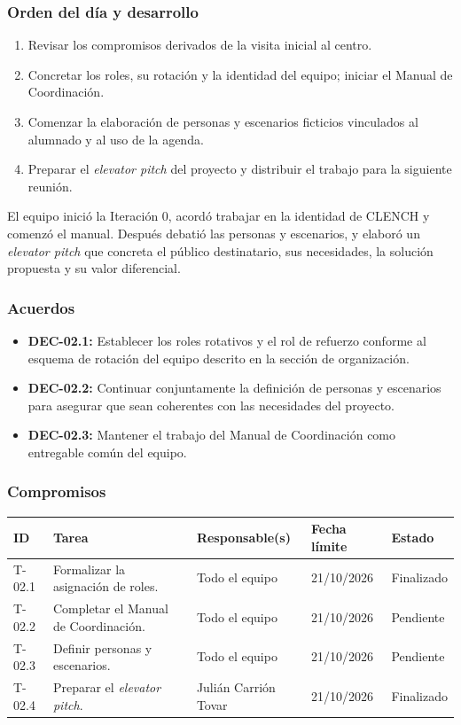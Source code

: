 \subsubsection{Orden del día y desarrollo}
\begin{enumerate}[leftmargin=*]
  \item Revisar los compromisos derivados de la visita inicial al centro.
  \item Concretar los roles, su rotación y la identidad del equipo; iniciar el Manual de Coordinación.
  \item Comenzar la elaboración de personas y escenarios ficticios vinculados al alumnado y al uso de la agenda.
  \item Preparar el \textit{elevator pitch} del proyecto y distribuir el trabajo para la siguiente reunión.
\end{enumerate}
El equipo inició la Iteración 0, acordó trabajar en la identidad de CLENCH y comenzó el manual. Después debatió las personas y escenarios, y elaboró un \textit{elevator pitch} que concreta el público destinatario, sus necesidades, la solución propuesta y su valor diferencial.

\subsubsection{Acuerdos}
\begin{itemize}[leftmargin=*]
  \item \textbf{DEC-02.1:} Establecer los roles rotativos y el rol de refuerzo conforme al esquema de rotación del equipo descrito en la sección de organización.
  \item \textbf{DEC-02.2:} Continuar conjuntamente la definición de personas y escenarios para asegurar que sean coherentes con las necesidades del proyecto.
  \item \textbf{DEC-02.3:} Mantener el trabajo del Manual de Coordinación como entregable común del equipo.
\end{itemize}

\subsubsection{Compromisos}
\begin{center}\footnotesize
\begin{tabularx}{\textwidth}{@{}p{}X p{}p{}p{}@{}}
\toprule
\rowcolor{tableHeader} ID & Tarea & Responsable(s) & Fecha límite & Estado \\
\midrule
T-02.1 & Formalizar la asignación de roles. & Todo el equipo & 21/10/2026 & Finalizado \\
T-02.2 & Completar el Manual de Coordinación. & Todo el equipo & 21/10/2026 & Pendiente \\
T-02.3 & Definir personas y escenarios. & Todo el equipo & 21/10/2026 & Pendiente \\
T-02.4 & Preparar el \textit{elevator pitch}. & Julián Carrión Tovar & 21/10/2026 & Finalizado \\
\bottomrule
\end{tabularx}
\end{center}

